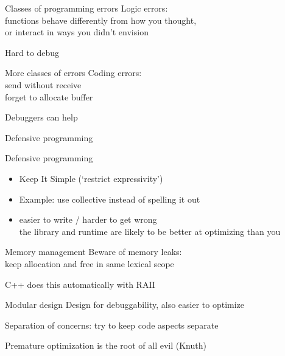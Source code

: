 
\begin{numberedframe}{Classes of programming errors}
  Logic errors:\\
  functions behave differently from how you thought,\\
  or interact in ways you didn't envision

  Hard to debug
\end{numberedframe}

\begin{numberedframe}{More classes of errors}
  Coding errors:\\
  send without receive\\
  forget to allocate buffer

  Debuggers can help
\end{numberedframe}

 {Defensive programming}

\begin{numberedframe}{Defensive programming}
  \begin{itemize}
  \item Keep It Simple (`restrict expressivity')
  \item Example: use collective instead of spelling it out
  \item easier to write / harder to get wrong\\
    the library and runtime are likely to be better at optimizing than you
  \end{itemize}
\end{numberedframe}

\begin{numberedframe}{Memory management}
  Beware of memory leaks:\\
  keep allocation and free in same lexical scope

  C++ does this automatically with RAII
\end{numberedframe}

\begin{numberedframe}{Modular design}
  Design for debuggability, also easier to optimize

  Separation of concerns: try to keep code aspects separate

  Premature optimization is the root of all evil (Knuth)
\end{numberedframe}

